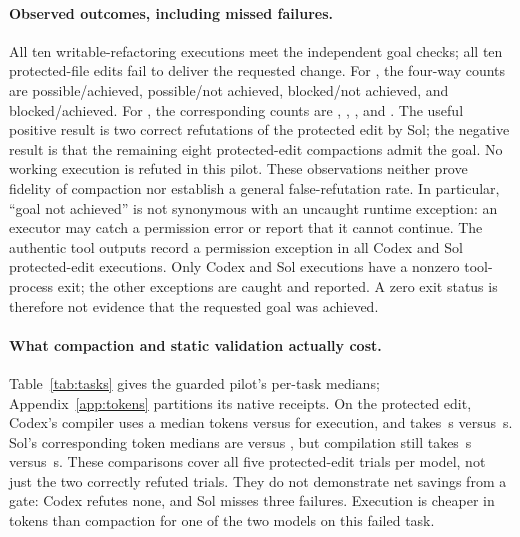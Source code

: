 \paragraph{Observed outcomes, including missed failures.}
All ten writable-refactoring executions meet the independent goal checks;
all ten protected-file edits fail to deliver the requested change.
For , the four-way counts are
\PilotCodexTruePossible{} possible/achieved,
\PilotCodexMissedBlocked{} possible/not achieved,
\PilotCodexTrueBlocked{} blocked/not achieved, and
\PilotCodexFalseBlocked{} blocked/achieved.
For , the corresponding counts are
\PilotSolTruePossible{}, \PilotSolMissedBlocked{},
\PilotSolTrueBlocked{}, and \PilotSolFalseBlocked{}.
The useful positive result is two correct refutations of the protected edit
by Sol; the negative result is that the remaining eight protected-edit
compactions admit the goal. No working execution is refuted in this pilot.
These observations neither prove fidelity of compaction nor establish a
general false-refutation rate. In particular, ``goal not achieved'' is not
synonymous with an uncaught runtime exception: an executor may catch a
permission error or report that it cannot continue.
The authentic tool outputs record a permission exception in all
\PilotCodexProtectedPermissionTrials{} Codex and
\PilotSolProtectedPermissionTrials{} Sol protected-edit executions.
Only \PilotCodexProtectedNonzeroTrials{} Codex and
\PilotSolProtectedNonzeroTrials{} Sol executions have a nonzero tool-process
exit; the other exceptions are caught and reported. A zero exit status is
therefore not evidence that the requested goal was achieved.

\paragraph{What compaction and static validation actually cost.}
Table~\ref{tab:tasks} gives the guarded pilot's per-task medians;
Appendix~\ref{app:tokens} partitions its native receipts.
On the protected edit, Codex's compiler uses a median
\PilotCodexProtectedCompileTokens{} tokens versus
\PilotCodexProtectedExecuteTokens{} for execution, and takes
\PilotCodexProtectedCompileSeconds{}\,s versus
\PilotCodexProtectedExecuteSeconds{}\,s. Sol's corresponding token medians
are \PilotSolProtectedCompileTokens{} versus
\PilotSolProtectedExecuteTokens{}, but compilation still takes
\PilotSolProtectedCompileSeconds{}\,s versus
\PilotSolProtectedExecuteSeconds{}\,s. These comparisons cover all five
protected-edit trials per model, not just the two correctly refuted trials.
They do not demonstrate net savings from a gate: Codex refutes none, and
Sol misses three failures. Execution is cheaper in tokens than compaction
for one of the two models on this failed task.

